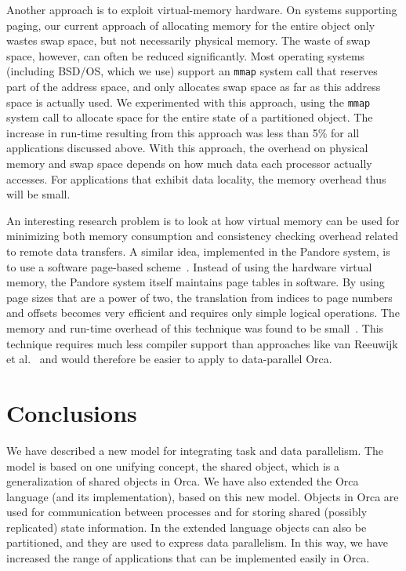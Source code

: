 \documentclass{acmtrans2e}
\begin{document}
Another approach is to exploit virtual-memory hardware.
On systems supporting paging, our current approach of allocating memory
for the entire object only wastes swap space, but not necessarily
physical memory.
The waste of swap space, however, can often be reduced significantly.
Most operating systems (including BSD/OS, which we use) support
an \verb+mmap+ system call that reserves
part of the address space, and only allocates swap space as far as this
address space is actually used.
We experimented with this approach, using the \verb+mmap+
system call to allocate
space for the entire state of a partitioned object.
The increase in run-time resulting from this approach was less than 5\%
for all applications discussed above.
With this approach, the overhead on physical memory and swap space
depends on how much data each processor actually accesses. For applications
that exhibit data locality, the memory overhead thus will be small.

An interesting research
problem is to look at how virtual memory can be used for minimizing
both memory consumption and consistency checking overhead related to
remote data transfers.
A similar idea, implemented in the Pandore system, is to use
a software page-based scheme~\cite{maheo:1993}.
Instead of using the hardware virtual memory, the Pandore system
itself maintains page tables in software.
By using page sizes that are a power of two, the translation
from indices to page numbers and offsets becomes very efficient and
requires only simple logical operations.
The memory and run-time overhead of this technique was found to be
small~\cite{maheo:1993}.
This technique requires much less compiler support than
approaches like van Reeuwijk et al.~\citeyear{reeuwijk:1996}
and would therefore be easier
to apply to data-parallel Orca.

\section{Conclusions}
\label{sec:conclusions}

We have described a new model for integrating task and data
parallelism.  The model is based on one unifying concept, the shared
object, which is a generalization of shared objects in Orca.
We have also extended the Orca language (and its implementation),
based on this new model.
Objects in Orca are used for communication between processes and for storing
shared (possibly replicated) state information. In the extended language
objects can also be partitioned,
and they are used to express data parallelism.
In this way, we have increased the range of applications that can
be implemented easily in Orca.
\end{document}
